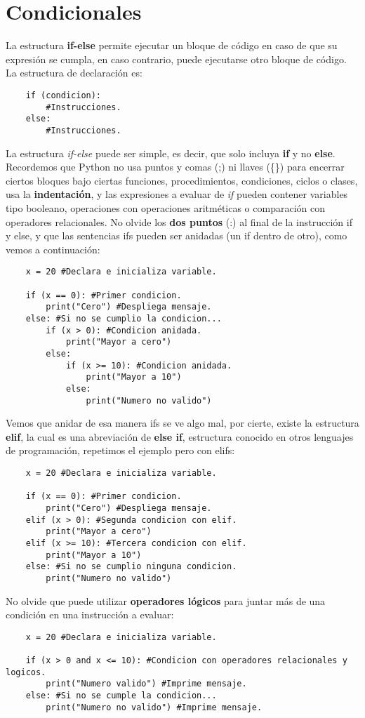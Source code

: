 \section{Condicionales}
\hspace{0.55cm}La estructura \textbf{if-else} permite ejecutar un bloque de código en caso de que su expresión se cumpla, en caso contrario, puede ejecutarse otro bloque de código. La estructura de declaración es:
\begin{lstlisting}
	if (condicion):
		#Instrucciones.
	else:
		#Instrucciones.
\end{lstlisting}

La estructura \textit{if-else} puede ser simple, es decir, que solo incluya \textbf{if} y no \textbf{else}. Recordemos que Python no usa puntos y comas (;) ni llaves (\{\}) para encerrar ciertos bloques bajo ciertas funciones, procedimientos, condiciones, ciclos o clases, usa la \textbf{indentación}, y las expresiones a evaluar de \textit{if} pueden contener variables tipo booleano, operaciones con operaciones aritméticas o comparación con operadores relacionales. No olvide los \textbf{dos puntos} (:) al final de la instrucción if y else, y que las sentencias ifs pueden ser anidadas (un if dentro de otro), como vemos a continuación:
\begin{lstlisting}
	x = 20 #Declara e inicializa variable.
	
	if (x == 0): #Primer condicion.
		print("Cero") #Despliega mensaje.
	else: #Si no se cumplio la condicion...
		if (x > 0): #Condicion anidada.
			print("Mayor a cero")
		else:
			if (x >= 10): #Condicion anidada.
				print("Mayor a 10")
			else:
				print("Numero no valido")
\end{lstlisting}

Vemos que anidar de esa manera ifs se ve algo mal, por cierte, existe la estructura \textbf{elif}, la cual es una abreviación de \textbf{else if}, estructura conocido en otros lenguajes de programación, repetimos el ejemplo pero con elifs:
\begin{lstlisting}
	x = 20 #Declara e inicializa variable.
	
	if (x == 0): #Primer condicion.
		print("Cero") #Despliega mensaje.
	elif (x > 0): #Segunda condicion con elif.
		print("Mayor a cero")
	elif (x >= 10): #Tercera condicion con elif.
		print("Mayor a 10")
	else: #Si no se cumplio ninguna condicion.
		print("Numero no valido")
\end{lstlisting}

No olvide que puede utilizar \textbf{operadores lógicos} para juntar más de una condición en una instrucción a evaluar:
\begin{lstlisting}
	x = 20 #Declara e inicializa variable.
	
	if (x > 0 and x <= 10): #Condicion con operadores relacionales y logicos.
		print("Numero valido") #Imprime mensaje.
	else: #Si no se cumple la condicion...
		print("Numero no valido") #Imprime mensaje.
\end{lstlisting}

